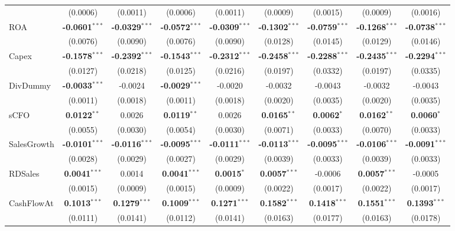 \begin{landscape}
\begin{table}[H]
\begin{tabular}{lcccccccc}
 & (0.0006) & (0.0011) & (0.0006) & (0.0011) & (0.0009) & (0.0015) & (0.0009) & (0.0016) \\
ROA & \textbf{-0.0601}$^{***}$ & \textbf{-0.0329}$^{***}$ & \textbf{-0.0572}$^{***}$ & \textbf{-0.0309}$^{***}$ & \textbf{-0.1302}$^{***}$ & \textbf{-0.0759}$^{***}$ & \textbf{-0.1268}$^{***}$ & \textbf{-0.0738}$^{***}$ \\
 & (0.0076) & (0.0090) & (0.0076) & (0.0090) & (0.0128) & (0.0145) & (0.0129) & (0.0146) \\
Capex & \textbf{-0.1578}$^{***}$ & \textbf{-0.2392}$^{***}$ & \textbf{-0.1543}$^{***}$ & \textbf{-0.2312}$^{***}$ & \textbf{-0.2458}$^{***}$ & \textbf{-0.2288}$^{***}$ & \textbf{-0.2435}$^{***}$ & \textbf{-0.2294}$^{***}$ \\
 & (0.0127) & (0.0218) & (0.0125) & (0.0216) & (0.0197) & (0.0332) & (0.0197) & (0.0335) \\
DivDummy & \textbf{-0.0033}$^{***}$ & -0.0024 & \textbf{-0.0029}$^{***}$ & -0.0020 & -0.0032 & -0.0043 & -0.0032 & -0.0043 \\
 & (0.0011) & (0.0018) & (0.0011) & (0.0018) & (0.0020) & (0.0035) & (0.0020) & (0.0035) \\
sCFO & \textbf{0.0122}$^{**}$ & 0.0026 & \textbf{0.0119}$^{**}$ & 0.0026 & \textbf{0.0165}$^{**}$ & \textbf{0.0062}$^{*}$ & \textbf{0.0162}$^{**}$ & \textbf{0.0060}$^{*}$ \\
 & (0.0055) & (0.0030) & (0.0054) & (0.0030) & (0.0071) & (0.0033) & (0.0070) & (0.0033) \\
SalesGrowth & \textbf{-0.0101}$^{***}$ & \textbf{-0.0116}$^{***}$ & \textbf{-0.0095}$^{***}$ & \textbf{-0.0111}$^{***}$ & \textbf{-0.0113}$^{***}$ & \textbf{-0.0095}$^{***}$ & \textbf{-0.0106}$^{***}$ & \textbf{-0.0091}$^{***}$ \\
 & (0.0028) & (0.0029) & (0.0027) & (0.0029) & (0.0039) & (0.0033) & (0.0039) & (0.0033) \\
RDSales & \textbf{0.0041}$^{***}$ & 0.0014 & \textbf{0.0041}$^{***}$ & \textbf{0.0015}$^{*}$ & \textbf{0.0057}$^{***}$ & -0.0006 & \textbf{0.0057}$^{***}$ & -0.0005 \\
 & (0.0015) & (0.0009) & (0.0015) & (0.0009) & (0.0022) & (0.0017) & (0.0022) & (0.0017) \\
CashFlowAt & \textbf{0.1013}$^{***}$ & \textbf{0.1279}$^{***}$ & \textbf{0.1009}$^{***}$ & \textbf{0.1271}$^{***}$ & \textbf{0.1582}$^{***}$ & \textbf{0.1418}$^{***}$ & \textbf{0.1551}$^{***}$ & \textbf{0.1393}$^{***}$ \\
 & (0.0111) & (0.0141) & (0.0112) & (0.0141) & (0.0163) & (0.0177) & (0.0163) & (0.0178) \\

\end{tabular}
\end{table}
\end{landscape}
